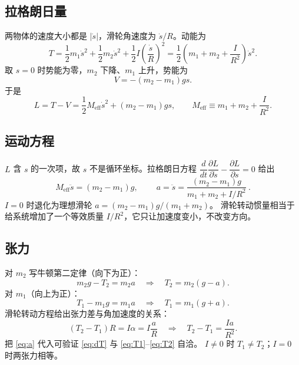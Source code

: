 \documentclass[UTF8,a4paper,11pt]{ctexart}
\begin{document}
\subsection{拉格朗日量}

两物体的速度大小都是 $|\dot s|$，滑轮角速度为 $\dot s/R$。动能为
\begin{equation}
  T=\frac12 m_1\dot s^2+\frac12 m_2\dot s^2+\frac12 I\left(\frac{\dot s}{R}\right)^2
   =\frac12\left(m_1+m_2+\frac{I}{R^2}\right)\dot s^2 .
  \label{eq:T}
\end{equation}
取 $s=0$ 时势能为零，$m_2$ 下降、$m_1$ 上升，势能为
\begin{equation}
  V=-(m_2-m_1)gs .
  \label{eq:V}
\end{equation}
于是
\begin{equation}
  L=T-V=\frac12 M_{\mathrm{eff}}\dot s^2+(m_2-m_1)gs,
  \qquad
  M_{\mathrm{eff}}\equiv m_1+m_2+\frac{I}{R^2}.
  \label{eq:L}
\end{equation}

\subsection{运动方程}

$L$ 含 $s$ 的一次项，故 $s$ 不是循环坐标。拉格朗日方程
$\dfrac{d}{dt}\dfrac{\partial L}{\partial\dot s}-\dfrac{\partial L}{\partial s}=0$ 给出
\begin{equation}
  M_{\mathrm{eff}}\ddot s=(m_2-m_1)g,
  \qquad
  \boxed{\ a=\ddot s=\frac{(m_2-m_1)g}{m_1+m_2+I/R^2}\ }.
  \label{eq:a}
\end{equation}
$I=0$ 时退化为理想滑轮 $a=(m_2-m_1)g/(m_1+m_2)$。
滑轮转动惯量相当于给系统增加了一个等效质量 $I/R^2$，它只让加速度变小，不改变方向。

\subsection{张力}

对 $m_2$ 写牛顿第二定律（向下为正）：
\begin{equation}
  m_2g-T_2=m_2a \quad\Longrightarrow\quad T_2=m_2(g-a).
  \label{eq:T2}
\end{equation}
对 $m_1$（向上为正）：
\begin{equation}
  T_1-m_1g=m_1a \quad\Longrightarrow\quad T_1=m_1(g+a).
  \label{eq:T1}
\end{equation}
滑轮转动方程给出张力差与角加速度的关系：
\begin{equation}
  (T_2-T_1)R=I\alpha=I\frac{a}{R}
  \quad\Longrightarrow\quad
  T_2-T_1=\frac{Ia}{R^2}.
  \label{eq:dT}
\end{equation}
把 \eqref{eq:a} 代入可验证 \eqref{eq:dT} 与 \eqref{eq:T1}--\eqref{eq:T2} 自洽。
$I\neq0$ 时 $T_1\neq T_2$；$I=0$ 时两张力相等。
\end{document}
